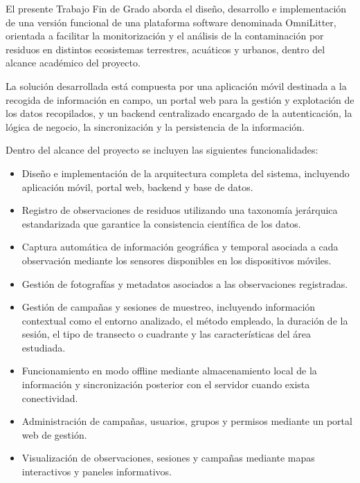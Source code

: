 El presente Trabajo Fin de Grado aborda el diseño, desarrollo e implementación de
una versión funcional de una plataforma software denominada OmniLitter, orientada
a facilitar la monitorización y el análisis de la contaminación por residuos en
distintos ecosistemas terrestres, acuáticos y urbanos, dentro del alcance
académico del proyecto.

La solución desarrollada está compuesta por una aplicación móvil destinada a la
recogida de información en campo, un portal web para la gestión y explotación de
los datos recopilados, y un backend centralizado encargado de la autenticación,
la lógica de negocio, la sincronización y la persistencia de la información.

Dentro del alcance del proyecto se incluyen las siguientes funcionalidades:

\begin{itemize}
    \item Diseño e implementación de la arquitectura completa del sistema,
    incluyendo aplicación móvil, portal web, backend y base de datos.

    \item Registro de observaciones de residuos utilizando una taxonomía
    jerárquica estandarizada que garantice la consistencia científica de los
    datos.

    \item Captura automática de información geográfica y temporal asociada a cada
    observación mediante los sensores disponibles en los dispositivos móviles.

    \item Gestión de fotografías y metadatos asociados a las observaciones
    registradas.

    \item Gestión de campañas y sesiones de muestreo, incluyendo información
    contextual como el entorno analizado, el método empleado, la duración de la
    sesión, el tipo de transecto o cuadrante y las características del área
    estudiada.

    \item Funcionamiento en modo offline mediante almacenamiento local de la
    información y sincronización posterior con el servidor cuando exista
    conectividad.

    \item Administración de campañas, usuarios, grupos y permisos mediante un
    portal web de gestión.

    \item Visualización de observaciones, sesiones y campañas mediante mapas
    interactivos y paneles informativos.


\end{itemize}
